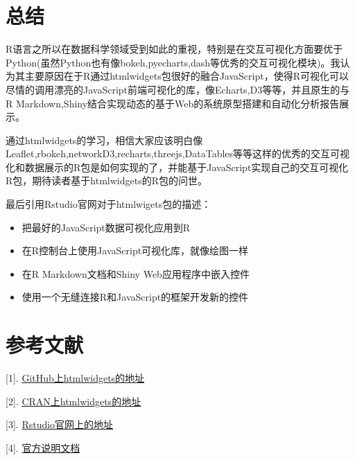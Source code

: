\documentclass[]{book}
\theoremstyle{definition}
\theoremstyle{definition}
\theoremstyle{definition}
\theoremstyle{remark}
\begin{document}
\chapter{总结}\label{summary}

R语言之所以在数据科学领域受到如此的重视，特别是在交互可视化方面要优于Python(虽然Python也有像bokeh,pyecharts,dash等优秀的交互可视化模块)。我认为其主要原因在于R通过htmlwidgets包很好的融合JavaScript，使得R可视化可以尽情的调用漂亮的JavaScript前端可视化的库，像Echarts,D3等等，并且原生的与R
Markdown,Shiny结合实现动态的基于Web的系统原型搭建和自动化分析报告展示。

通过htmlwidgets的学习，相信大家应该明白像Leaflet,rbokeh,networkD3,recharts,threejs,DataTables等等这样的优秀的交互可视化和数据展示的R包是如何实现的了，并能基于JavaScript实现自己的交互可视化R包，期待读者基于htmlwidgets的R包的问世。

最后引用Rstudio官网对于htmlwigets包的描述：

\begin{itemize}
\item
  把最好的JavaScript数据可视化应用到R
\item
  在R控制台上使用JavaScript可视化库，就像绘图一样
\item
  在R Markdown文档和Shiny Web应用程序中嵌入控件
\item
  使用一个无缝连接R和JavaScript的框架开发新的控件
\end{itemize}

\chapter{参考文献}\label{reference}

{[}1{]}.
\href{https://github.com/ramnathv/htmlwidgets}{GitHub上htmlwidgets的地址}

{[}2{]}.
\href{https://CRAN.R-project.org/package=htmlwidgets}{CRAN上htmlwidgets的地址}

{[}3{]}. \href{https://www.htmlwidgets.org/}{Rstudio官网上的地址}

{[}4{]}.
\href{https://cran.r-project.org/web/packages/htmlwidgets/htmlwidgets.pdf}{官方说明文档}


\end{document}
